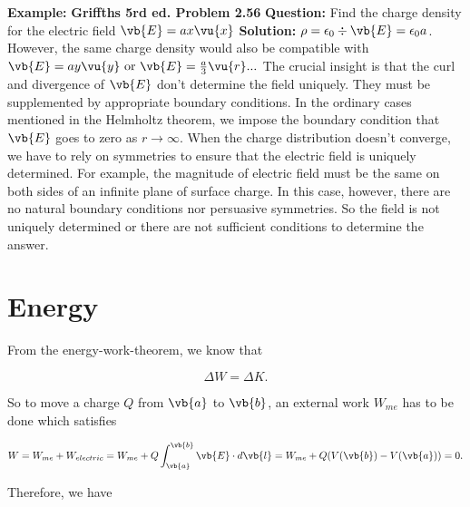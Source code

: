 \documentclass[a4paper,12pt]{report}
\begin{document}
	\begin{example_template}
		\textbf{Example:} \textbf{Griffths 5rd ed. Problem 2.56} \newline \newline
		\textbf{Question:} Find the charge density for the electric field \(\vb{E} = ax \vu{x} \)
		\newline \newline
		\textbf{Solution:}  \(\rho = \epsilon_0 \div{\vb{E} } = \epsilon_0 a\). However, the same charge density would also be compatible with \(\vb{E} = ay \vu{y} \text{ or } \vb{E} = \frac{a}{3} \vu{r} ...\) The crucial insight is that the curl and divergence of  \(\vb{E} \) don't determine the field uniquely. They must be supplemented by appropriate boundary conditions. In the ordinary cases mentioned in the Helmholtz theorem, we impose the boundary condition that \(\vb{E}\) goes to zero as \(r \rightarrow \infty\). When the charge distribution doesn't converge, we have to rely on symmetries to ensure that the electric field is uniquely determined. For example, the magnitude of electric field must be the same on both sides of an infinite plane of surface charge. In this case, however, there are no natural boundary conditions nor persuasive symmetries. So the field is not uniquely determined or there are not sufficient conditions to determine the answer.
		
		
		
		
		
		
	\end{example_template}
	
	
	
	
	\section{Energy}
	From the energy-work-theorem, we know that 
	
	\begin{equation}
		\Delta W = \Delta K.
	\end{equation}
	
	So to move a charge \(Q\) from \(\vb{a} \) to \(\vb{b} \), an external work \(W_{me} \) has to be done which satisfies
	
	\begin{equation}
		W = W_{me} + W_{electric} = W_{me} + Q \int_{\vb{a}  }^{\vb{b} } \vb{E} \cdot d\vb{l} =  W_{me} + Q(V(\vb{b} ) - V(\vb{a} )) = 0.
	\end{equation}
	
	Therefore, we have 
	
\end{document}
